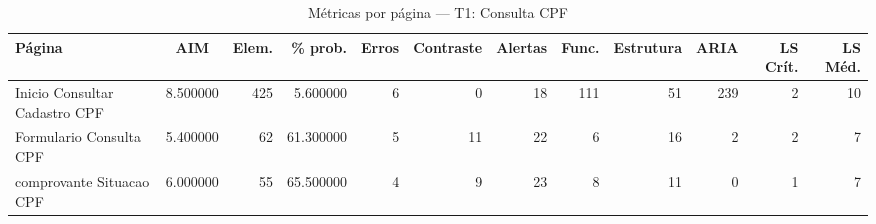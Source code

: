 \begin{table}[htbp]
  \centering
  \caption{Métricas por página — T1: Consulta CPF}
  \label{tab:flow_t1_consulta_cpf}
  \small
  \begin{tabular}{lcrrrrrrrrrr}
\toprule
Página & AIM & Elem. & \% prob. & Erros & Contraste & Alertas & Func. & Estrutura & ARIA & LS Crít. & LS Méd. \\
\midrule
Inicio Consultar Cadastro CPF & 8.500000 & 425 & 5.600000 & 6 & 0 & 18 & 111 & 51 & 239 & 2 & 10 \\
Formulario Consulta CPF & 5.400000 & 62 & 61.300000 & 5 & 11 & 22 & 6 & 16 & 2 & 2 & 7 \\
comprovante Situacao CPF & 6.000000 & 55 & 65.500000 & 4 & 9 & 23 & 8 & 11 & 0 & 1 & 7 \\
\bottomrule
\end{tabular}
\end{table}
